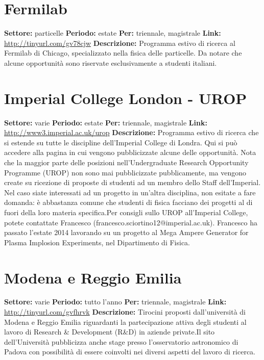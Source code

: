 \documentclass[a4paper,10pt]{article}
\begin{document}
\section{Fermilab}
\textbf{Settore:} particelle \newline
\textbf{Periodo:} estate \newline
\textbf{Per:} triennale, magistrale \newline
\textbf{Link:} \url{http://tinyurl.com/gv78cjw} \newline
\textbf{Descrizione:} Programma estivo di ricerca al Fermilab di Chicago, specializzato nella fisica delle particelle. Da notare che alcune opportunità sono riservate esclusivamente a studenti italiani.  

\section{Imperial College London - UROP}
\textbf{Settore:} varie\newline
\textbf{Periodo:} estate\newline
\textbf{Per:} triennale, magistrale\newline
\textbf{Link:} \url{http://www3.imperial.ac.uk/urop} \newline
\textbf{Descrizione:}  Programma estivo di ricerca che si estende su tutte le discipline dell’Imperial College di Londra. Qui si può accedere alla pagina in cui vengono pubblicizzate alcune delle opportunità. Nota che la maggior parte delle posizioni nell'Undergraduate Research Opportunity Programme (UROP) non sono mai pubblicizzate pubblicamente, ma vengono create su ricezione di proposte di studenti ad un membro dello Staff dell'Imperial. Nel caso siate interessati ad un progetto in un’altra disciplina, non esitate a fare domanda: è abbastanza comune che studenti di fisica facciano dei progetti al di fuori della loro materia specifica.Per consigli sullo UROP all'Imperial College, potete contattate Francesco (francesco.sciortino12@imperial.ac.uk). Francesco ha passato l'estate 2014 lavorando su un progetto al Mega Ampere Generator for Plasma Implosion Experiments, nel Dipartimento di Fisica.   

\section{Modena e Reggio Emilia}
\textbf{Settore:} varie\newline
\textbf{Periodo:} tutto l'anno\newline
\textbf{Per:} triennale, magistrale\newline
\textbf{Link:} \url{http://tinyurl.com/gvfhrvk} \newline
\textbf{Descrizione:} Tirocini proposti dall’università di Modena e Reggio Emilia riguardanti la partecipazione attiva degli studenti al lavoro di Research \& Development (R\&D) in aziende private.Il sito dell’Università pubblicizza anche stage presso l’osservatorio astronomico di Padova con possibilità di essere coinvolti nei diversi aspetti del lavoro di ricerca.  
\end{document}
